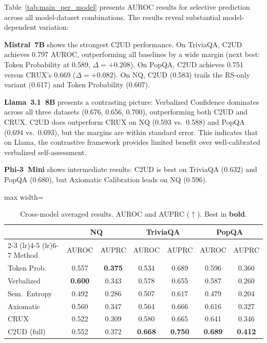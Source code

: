 \documentclass{article}
\newcommand{\ours}{\textsc{C2UD}}
\begin{document}
Table~\ref{tab:main_per_model} presents AUROC results for selective prediction across all model-dataset combinations.
The results reveal substantial model-dependent variation:

\textbf{Mistral~7B} shows the strongest \ours{} performance.
On TriviaQA, \ours{} achieves 0.797 AUROC, outperforming all baselines by a wide margin (next best: Token Probability at 0.589, $\Delta = +0.208$).
On PopQA, \ours{} achieves 0.751 versus CRUX's 0.669 ($\Delta = +0.082$).
On NQ, \ours{} (0.583) trails the RS-only variant (0.617) and Token Probability (0.607).

\textbf{Llama~3.1~8B} presents a contrasting picture: Verbalized Confidence dominates across all three datasets (0.676, 0.656, 0.700), outperforming both \ours{} and CRUX.
\ours{} does outperform CRUX on NQ (0.593 vs.\ 0.588) and PopQA (0.694 vs.\ 0.693), but the margins are within standard error.
This indicates that on Llama, the contrastive framework provides limited benefit over well-calibrated verbalized self-assessment.

\textbf{Phi-3~Mini} shows intermediate results: \ours{} is best on TriviaQA (0.632) and PopQA (0.680), but Axiomatic Calibration leads on NQ (0.596).

\begin{table}[t]
\caption{Cross-model averaged results. AUROC and AUPRC ($\uparrow$). Best in \textbf{bold}.}
\label{tab:main_avg}
\centering
\begin{adjustbox}{max width=\textwidth}
\begin{tabular}{l cc cc cc}
\toprule
& \multicolumn{2}{c}{NQ} & \multicolumn{2}{c}{TriviaQA} & \multicolumn{2}{c}{PopQA} \\
\cmidrule(lr){2-3} \cmidrule(lr){4-5} \cmidrule(lr){6-7}
Method & AUROC & AUPRC & AUROC & AUPRC & AUROC & AUPRC \\
\midrule
Token Prob. & 0.557 & \textbf{0.375} & 0.534 & 0.689 & 0.596 & 0.360 \\
Verbalized & \textbf{0.600} & 0.343 & 0.578 & 0.655 & 0.587 & 0.260 \\
Sem.\ Entropy & 0.492 & 0.286 & 0.507 & 0.617 & 0.479 & 0.204 \\
Axiomatic & 0.560 & 0.347 & 0.564 & 0.666 & 0.616 & 0.327 \\
\midrule
CRUX & 0.522 & 0.309 & 0.580 & 0.665 & 0.641 & 0.346 \\
\ours{} (full) & 0.552 & 0.372 & \textbf{0.668} & \textbf{0.750} & \textbf{0.689} & \textbf{0.412} \\
\bottomrule
\end{tabular}
\end{adjustbox}
\end{table}
\end{document}
